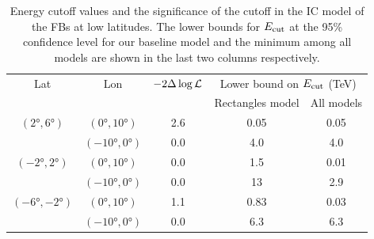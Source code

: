 %

\begin{table}
  \begin{center}
    \caption{Energy cutoff values and the significance of the cutoff in the IC model of the FBs at low latitudes.
The lower bounds for $E_{\text{cut}}$ at the 95\% confidence level for our baseline model and the minimum among all
models are shown in the last two columns respectively.
}
    \label{tab:IC}
    \begin{tabular}{|c|c|c|c|c|} %
     	\hline
		 Lat & Lon  & $-2 \Delta \log {\mathcal{L}}$ & \multicolumn{2}{c|}{Lower bound on $E_{\text{cut}}$ (TeV) } \\ 
		       &        &                                  &  \multicolumn{1}{c}{Rectangles model} & All models \\ 
		\hline
  		$(\ang{2}, \ang{6})$ & $(\ang{0}, \ang{10})$ & 2.6  & 0.05 & 0.05 \\ 
		& $(\ang{-10}, \ang{0})$ & 0.0  & 4.0  & 4.0 \\ 
 		\hline
  		$(\ang{-2}, \ang{2})$ & $(\ang{0}, \ang{10})$ & 0.0 & 1.5 & 0.01 \\ 
		& $(\ang{-10}, \ang{0})$ & 0.0 & 13  & 2.9  \\ 
 		\hline
  		$(\ang{-6}, \ang{-2})$ & $(\ang{0}, \ang{10})$ & 1.1 & 0.83 & 0.03 \\ 
		& $(\ang{-10}, \ang{0})$& 0.0 & 6.3 & 6.3\\ 
 \hline
    \end{tabular}
  \end{center}
\end{table}




